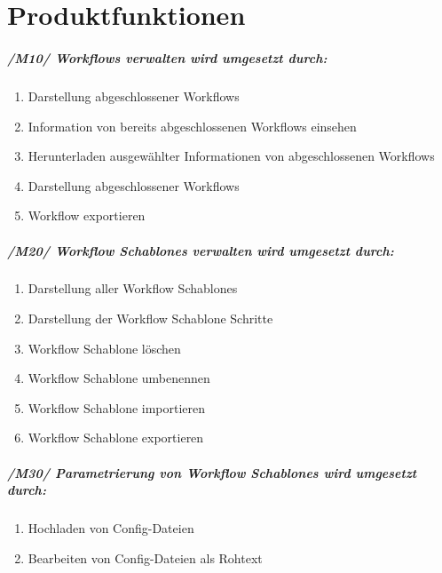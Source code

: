 \chapter{Produktfunktionen}

\paragraph{/M10/ \textit{\glspl{Workflow} verwalten} wird umgesetzt durch:}


\renewcommand{\labelenumi}{/FA\arabic{enumi}0/}
\begin{enumerate}
    \setlength\itemsep{-1em}    
    \item Darstellung abgeschlossener \glspl{Workflow}
    \item Information von bereits abgeschlossenen \glspl{Workflow} einsehen
    \item Herunterladen ausgewählter Informationen von abgeschlossenen \glspl{Workflow}
    \item Darstellung abgeschlossener \glspl{Workflow}
    \item \gls{Workflow} exportieren
    \setcounter{FAs}{\value{enumi}}
\end{enumerate}

\paragraph{/M20/ \textit{\glspl{Workflow Schablone} verwalten} wird umgesetzt durch:}
\begin{enumerate}
    \setlength\itemsep{-1em}
    \setcounter{enumi}{\value{FAs}}
    \item Darstellung aller \glspl{Workflow Schablone}
    \item Darstellung der \gls{Workflow Schablone} Schritte
    \item \gls{Workflow Schablone} löschen
    \item \gls{Workflow Schablone} umbenennen
        \item \gls{Workflow Schablone} importieren
    \item \gls{Workflow Schablone} exportieren
    \setcounter{FAs}{\value{enumi}}
\end{enumerate}

\paragraph{/M30/ \textit{Parametrierung von \glspl{Workflow Schablone}} wird umgesetzt durch:}
\begin{enumerate}
    \setlength\itemsep{-1em}
    \setcounter{enumi}{\value{FAs}}
    \item Hochladen von Config-Dateien
    \item Bearbeiten von Config-Dateien als Rohtext
    \setcounter{FAs}{\value{enumi}}
\end{enumerate}
\newpage
